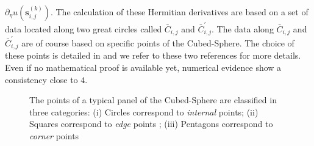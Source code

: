 $\partial_\eta u(\mathbf{s}^{(k)}_{i,j})$. The calculation of 
these Hermitian derivatives are
based on a set of data located along two great circles called $\bar{C}_{i,j}$ and $\bar{C}^\prime_{i,j}$.
The data along $\bar{C}_{i,j}$ and $\bar{C}^\prime_{i,j}$
are of course based on specific points of the Cubed-Sphere.
The choice of these points is detailed in \cite{Croisille-10, Croisille-12}
and we refer to these two references for more details.
Even if no mathematical proof is available yet, 
numerical evidence show a consistency close to $4$.
\begin{figure}
   \def\svgwidth{0.4 \textwidth}

\caption{The points of a typical panel of the Cubed-Sphere are classified in three categories:
(i) Circles correspond to {\sl internal} points; (ii) Squares correspond to {\sl edge} points ;
(iii) Pentagons correspond to {\sl corner} points}
\label{fig:1}
\end{figure}